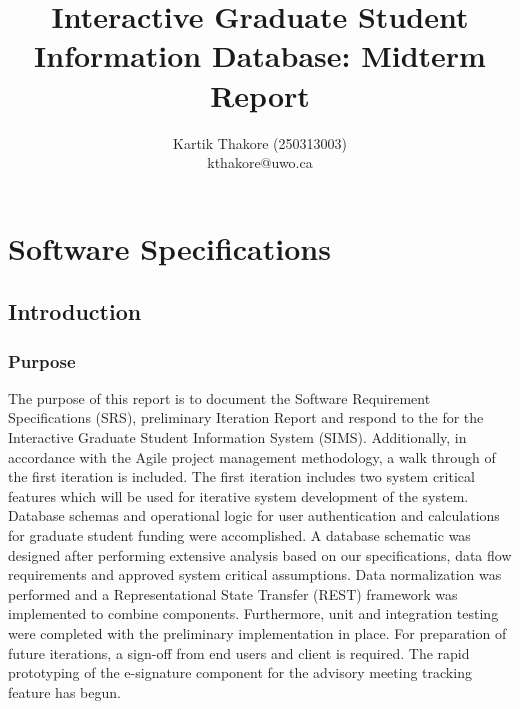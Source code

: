 \documentclass[11pt,a4paper]{report}
\begin{document}
\title{Interactive Graduate Student Information Database: Midterm Report} 
\author{Kartik Thakore (250313003)\\kthakore@uwo.ca}
\maketitle

\tableofcontents
\clearpage
\newpage
\chapter{Software Specifications}
\section{Introduction}
\subsection{Purpose}
The purpose of this report is to document the Software Requirement Specifications (SRS), preliminary Iteration Report and respond to the 
for the Interactive Graduate Student Information System (SIMS). 
Additionally, in accordance with the Agile project management methodology, a walk through of the first iteration is included. 
The first iteration includes two system critical features which will be used for iterative system development of the system.
 Database schemas and operational logic for user authentication and calculations for graduate student funding were accomplished.
A database schematic was designed after performing extensive analysis based on our specifications, data flow
requirements and approved system critical assumptions. Data normalization was performed and a Representational State Transfer (REST) framework was implemented to combine components. Furthermore, unit and integration testing were completed with the preliminary implementation in place. For preparation of future
iterations, a sign-off from end users and client is required. The rapid prototyping of the e-signature component for the advisory meeting tracking feature has begun.
\end{document}
